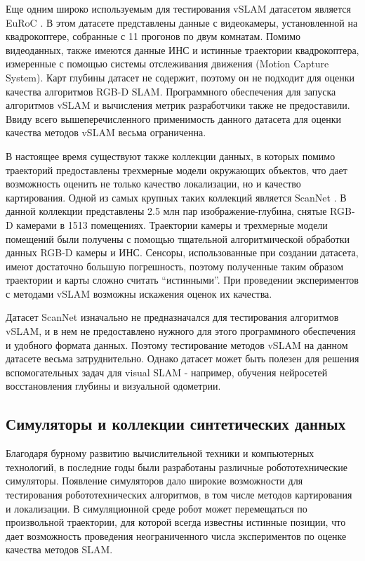 \documentclass{mipt-thesis-ms}
\begin{document}
	Еще одним широко используемым для тестирования vSLAM датасетом является EuRoC \cite{burri2016euroc}. В этом датасете представлены данные с видеокамеры, установленной на квадрокоптере, собранные с 11 прогонов по двум комнатам. Помимо видеоданных, также имеются данные ИНС и истинные траектории квадрокоптера, измеренные с помощью системы отслеживания движения (Motion Capture System). Карт глубины датасет не содержит, поэтому он не подходит для оценки качества алгоритмов RGB-D SLAM. Программного обеспечения для запуска алгоритмов vSLAM и вычисления метрик разработчики также не предоставили. Ввиду всего вышеперечисленного применимость данного датасета для оценки качества методов vSLAM весьма ограниченна.
	
	В настоящее время существуют также коллекции данных, в которых помимо траекторий предоставлены трехмерные модели окружающих объектов, что дает возможность оценить не только качество локализации, но и качество картирования. Одной из самых крупных таких коллекций является ScanNet \cite{dai2017scannet}. В данной коллекции представлены 2.5 млн пар изображение-глубина, снятые RGB-D камерами в 1513 помещениях. Траектории камеры и трехмерные модели помещений были получены с помощью тщательной алгоритмической обработки данных RGB-D камеры и ИНС. Сенсоры, использованные при создании датасета, имеют достаточно большую погрешность, поэтому полученные таким образом траектории и карты сложно считать ``истинными''. При проведении экспериментов с методами vSLAM возможны искажения оценок их качества.
	
	Датасет ScanNet изначально не предназначался для тестирования алгоритмов vSLAM, и в нем не предоставлено нужного для этого программного обеспечения и удобного формата данных. Поэтому тестирование методов vSLAM на данном датасете весьма затруднительно. Однако датасет может быть полезен для решения вспомогательных задач для visual SLAM - например, обучения нейросетей восстановления глубины и визуальной одометрии.
	
	\subsection{Симуляторы и коллекции синтетических данных}
	\label{section_synthetic_datasets}
	
	Благодаря бурному развитию вычислительной техники и компьютерных технологий, в последние годы были разработаны различные робототехнические симуляторы. Появление симуляторов дало широкие возможности для тестирования робототехнических алгоритмов, в том числе методов картирования и локализации. В симуляционной среде робот может перемещаться по произвольной траектории, для которой всегда известны истинные позиции, что дает возможность проведения неограниченного числа экспериментов по оценке качества методов SLAM.
	
\end{document}
